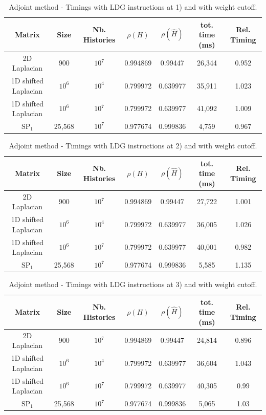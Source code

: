 \documentclass[a4paper,10pt]{article}
\begin{document}
\begin{table}[!h]
\hspace*{-1cm}
\begin{tabular}{|c|c|c|c|c|c|c|}
\hline
\textbf{Matrix} & \textbf{Size} &\textbf{Nb. Histories} & $\rho(H)$ 
& $\rho(\hat{H})$ & tot. time (ms) & Rel. Timing\\
\hline
2D Laplacian& 900 & $10^7$ & 0.994869 & 0.99447 & 26,344 & 0.952\\
\hline 
1D shifted Laplacian& $10^6$ & $10^4$ & 0.799972 & 0.639977 & 35,911 & 1.023\\
\hline
1D shifted Laplacian& $10^6$ & $10^7$ & 0.799972 & 0.639977 & 41,092 & 1.009\\
\hline
$\text{SP}_1$ & 25,568 & $10^7$ & 0.977674 & 0.999836 & 4,759 & 0.967\\
\hline
\end{tabular}
\caption{Adjoint method - Timings with LDG instructions at 1) and with weight 
cutoff.}
\label{tab12}
\end{table}



\begin{table}[!h]
\hspace*{-1cm}
\begin{tabular}{|c|c|c|c|c|c|c|}
\hline
\textbf{Matrix} & \textbf{Size} &\textbf{Nb. Histories} & $\rho(H)$ 
& $\rho(\hat{H})$ & tot. time (ms)& Rel. Timing\\
\hline
2D Laplacian& 900 & $10^7$ & 0.994869 & 0.99447 & 27,722 & 1.001\\
\hline 
1D shifted Laplacian& $10^6$ & $10^4$ & 0.799972 & 0.639977 & 36,005 & 1.026\\
\hline
1D shifted Laplacian& $10^6$ & $10^7$ & 0.799972 & 0.639977 & 40,001 & 0.982\\
\hline
$\text{SP}_1$ & 25,568 & $10^7$ & 0.977674 & 0.999836 & 5,585 & 1.135\\
\hline
\end{tabular}
\caption{Adjoint method - Timings with LDG instructions at 2) and with weight 
cutoff.}
\label{tab13}
\end{table}



\begin{table}[!h]
\hspace*{-1cm}
\begin{tabular}{|c|c|c|c|c|c|c|}
\hline
\textbf{Matrix} & \textbf{Size} &\textbf{Nb. Histories} & $\rho(H)$ 
& $\rho(\hat{H})$ & tot. time (ms) & Rel. Timing\\
\hline
2D Laplacian& 900 & $10^7$ & 0.994869 & 0.99447 & 24,814 & 0.896\\
\hline 
1D shifted Laplacian& $10^6$ & $10^4$ & 0.799972 & 0.639977 & 36,604 & 1.043\\
\hline
1D shifted Laplacian& $10^6$ & $10^7$ & 0.799972 & 0.639977 & 40,305 & 0.99\\
\hline
$\text{SP}_1$ & 25,568 & $10^7$ & 0.977674 & 0.999836 & 5,065 & 1.03\\
\hline
\end{tabular}
\caption{Adjoint method - Timings with LDG instructions at 3) and with weight 
cutoff.}
\label{tab14}
\end{table}
\end{document}
